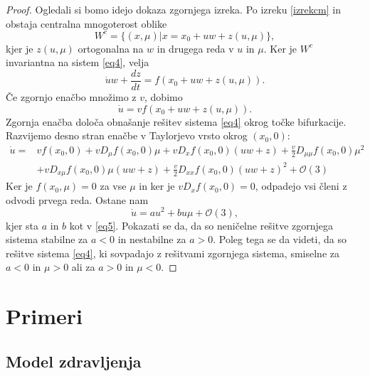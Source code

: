\documentclass[a4paper,12pt]{article}
\begin{document}
\begin{proof}
    Ogledali si bomo idejo dokaza zgornjega izreka. 
    Po izreku \ref{izrekcm} in \cite{vir2} obstaja centralna mnogoterost oblike 
    \[W^c=\{(x,\mu)|x=x_0+uw+z(u,\mu)\},\]
    kjer je \(z(u,\mu)\) ortogonalna na \(w\) in drugega reda v \(u\) in \(\mu\). 
    Ker je \(W^c\) invariantna na sistem \ref{eq4}, velja 
    \[\dot{u}w+\frac{dz}{dt}=f(x_0+uw+z(u,\mu)).\]
    Če zgornjo enačbo množimo z \(v\), dobimo 
    \[\dot{u}=vf(x_0+uw+z(u,\mu)).\]
    Zgornja enačba določa obnašanje rešitev sistema \ref{eq4} okrog točke bifurkacije. 
    Razvijemo desno stran enačbe v Taylorjevo vrsto okrog \((x_0,0)\):
    \begin{align*}
    \dot{u}=&vf(x_0,0)+vD_{\mu}f(x_0,0)\mu+vD_xf(x_0,0)(uw+z)+\frac{v}{2}D_{\mu\mu}f(x_0,0)\mu^2\\
    &+vD_{x\mu}f(x_0,0)\mu (uw+z)+\frac{v}{2}D_{xx}f(x_0,0)(uw+z)^2+\mathcal{O}(3)
    \end{align*}
    Ker je \(f(x_0,\mu)=0\) za vse \(\mu\) in ker je \(vD_xf(x_0,0)=0\), odpadejo vsi
    členi z odvodi prvega reda. Ostane nam 
    \[\dot{u}=au^2 + bu\mu +\mathcal{O}(3),\]
    kjer sta \(a\) in \(b\) kot v \ref{eq5}. 
    Pokazati se da, da so neničelne rešitve zgornjega sistema stabilne za \(a<0\) in 
    nestabilne za \(a>0\). Poleg tega se da videti, da so rešitve sistema \ref{eq4},
    ki sovpadajo z rešitvami zgornjega sistema, smiselne za \(a<0\) in \(\mu>0\) ali za \(a>0\) in \(\mu<0\).

\end{proof}

\section{Primeri}
\subsection{Model zdravljenja}
\end{document}
